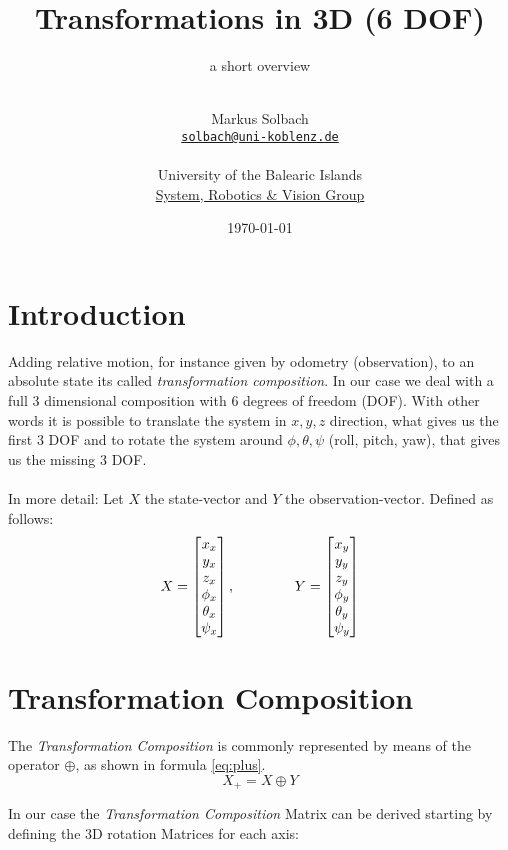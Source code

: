 \documentclass[10pt,a4paper]{scrartcl}
\author{\\Markus Solbach \\ \href{mailto:solbach@uni-koblenz.de}{\texttt{solbach@uni-koblenz.de}} \\\\  University of the Balearic Islands \\ \href{http://srv.uib.es/}{System, Robotics \& Vision Group} }
\date{\today}
\begin{document}
\title{Transformations in 3D (6 DOF)}
\subtitle{a short overview}
\maketitle\newpage

\section{Introduction}\label{ch:intro}
Adding relative motion, for instance given by odometry (observation), to an absolute state its called \textit{transformation composition}. In our case we deal with a full 3 dimensional composition with 6 degrees of freedom (DOF). With other words it is possible to translate the system in $x, y, z$ direction, what gives us the first 3 DOF and to rotate the system around $\phi, \theta, \psi$ (roll, pitch, yaw), that gives us the missing 3 DOF.
\\\\ In more detail: Let $X$ the state-vector and $Y$ the observation-vector. Defined as follows:
\begin{equation}
X = \begin{bmatrix} x_x \\ y_x \\ z_x \\ \phi_x \\ \theta_x \\ \psi_x \end{bmatrix}, \hspace{15 mm} Y = \begin{bmatrix} x_y \\ y_y \\ z_y \\ \phi_y \\ \theta_y \\ \psi_y \end{bmatrix}
\end{equation}


\section{Transformation Composition}
The \textit{Transformation Composition} is commonly represented by means of the operator $\oplus$, as shown in formula \ref{eq:plus}.
\begin{equation}\label{eq:plus}
X_+ = X \oplus Y
\end{equation}

In our case the \textit{Transformation Composition} Matrix can be derived starting by defining the 3D rotation Matrices for each axis:
\end{document}
